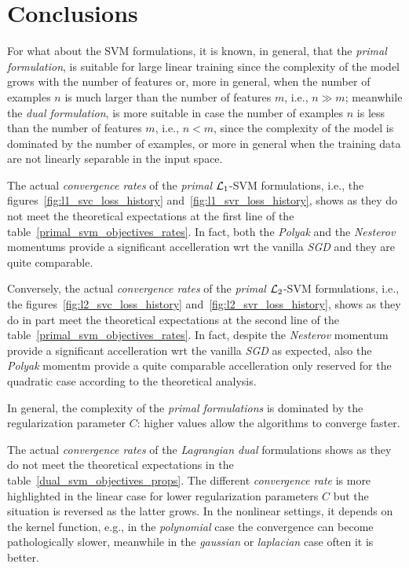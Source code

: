 \section{Conclusions}

For what about the SVM formulations, it is known, in general, that the \emph{primal formulation}, is suitable for large linear training since the complexity of the model grows with the number of features or, more in general, when the number of examples $n$ is much larger than the number of features $m$, i.e., $n \gg m$; meanwhile the \emph{dual formulation}, is more suitable in case the number of examples $n$ is less than the number of features $m$, i.e., $n < m$, since the complexity of the model is dominated by the number of examples, or more in general when the training data are not linearly separable in the input space.

\bigskip

The actual \emph{convergence rates} of the \emph{primal} $\protect \mathcal{L}_1$-SVM formulations, i.e., the figures~\ref{fig:l1_svc_loss_history} and~\ref{fig:l1_svr_loss_history}, shows as they do not meet the theoretical expectations at the first line of the table~\ref{primal_svm_objectives_rates}. In fact, both the \emph{Polyak} and the \emph{Nesterov} momentums provide a significant accelleration wrt the vanilla \emph{SGD} and they are quite comparable.

Conversely, the actual \emph{convergence rates} of the \emph{primal} $\protect \mathcal{L}_2$-SVM formulations, i.e., the figures~\ref{fig:l2_svc_loss_history} and~\ref{fig:l2_svr_loss_history}, shows as they do in part meet the theoretical expectations at the second line of the table~\ref{primal_svm_objectives_rates}. In fact, despite the \emph{Nesterov} momentum provide a significant accelleration wrt the vanilla \emph{SGD} as expected, also the \emph{Polyak} momentm provide a quite comparable accelleration only reserved for the quadratic case according to the theoretical analysis.

In general, the complexity of the \emph{primal formulations} is dominated by the regularization parameter $C$: higher values allow the algorithms to converge faster.

\bigskip

The actual \emph{convergence rates} of the \emph{Lagrangian dual} formulations shows as they do not meet the theoretical expectations in the table~\ref{dual_svm_objectives_props}. The different \emph{convergence rate} is more highlighted in the linear case for lower regularization parameters $C$ but the situation is reversed as the latter grows. In the nonlinear settings, it depends on the kernel function, e.g., in the \emph{polynomial} case the convergence can become pathologically slower, meanwhile in the \emph{gaussian} or \emph{laplacian} case often it is better.

